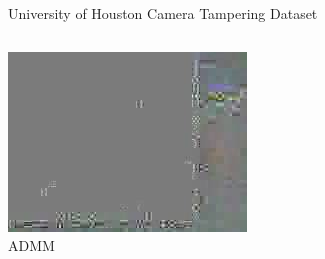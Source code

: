 \documentclass[10pt]{beamer}
\begin{document}
\begin{frame}{University of Houston Camera Tampering Dataset}
\begin{columns}
{            \includegraphics[width = \textwidth]{figures/rsvd_uhctd/ALMfg_frame75.jpg}\\
            {\centering ADMM}
        }
\end{columns}
\end{frame}
\end{document}
